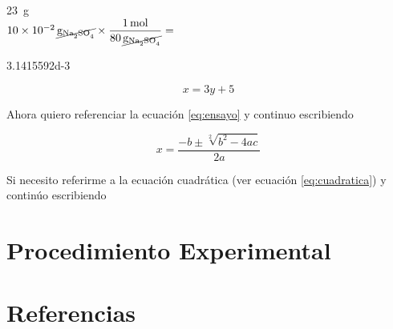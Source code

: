 \documentclass[12pt,letterpaper]{article}
\begin{document}
\SI{23}{\gram}\\

$\SI{10d-2}{\cancel\gram\of{\ce{Na2SO4}}} \times \dfrac{\SI{1}{\mole}}{\SI{80}{\cancel\gram\of{\ce{Na2SO4}}}} = $

\num{3.1415592d-3}

\begin{equation}
\label{eq:ensayo}
x=3y+5
\end{equation}

Ahora quiero referenciar la ecuación \ref{eq:ensayo} y continuo escribiendo


\begin{equation}
\label{eq:cuadratica}
x=\frac { -b\pm \sqrt [ 2 ]{ { b }^{ 2 }-4ac }  }{ 2a } 
\end{equation}

Si necesito referirme a la ecuación cuadrática (ver ecuación \ref{eq:cuadratica}) y continúo escribiendo


\section{Procedimiento Experimental\label{sec:procedure}}

\section{Referencias\label{sec:references}}


\printbibliography[heading=none]
		
\end{document}
